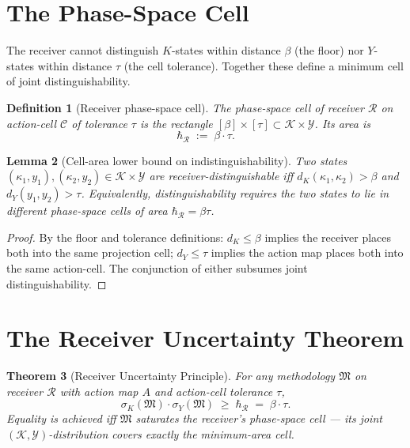 \documentclass[11pt,a4paper]{article}
\newtheorem{theorem}{Theorem}[section]
\newtheorem{lemma}[theorem]{Lemma}
\newtheorem{definition}[theorem]{Definition}
\newcommand{\Action}{\mathcal{Y}}
\newcommand{\Knowl}{\mathcal{K}}
\newcommand{\Cell}{\mathcal{C}}
\newcommand{\Method}{\mathfrak{M}}
\newcommand{\receiver}{\mathcal{R}}
\newcommand{\hbarR}{\hbar_{\receiver}}
\newcommand{\disp}{\sigma}
\begin{document}
\section{The Phase-Space Cell}

The receiver cannot distinguish $K$-states within distance $\beta$ (the floor) nor $Y$-states within distance $\tau$ (the cell tolerance). Together these define a minimum cell of joint distinguishability.

\begin{definition}[Receiver phase-space cell]
\label{def:phase-cell}
The \emph{phase-space cell} of receiver $\receiver$ on action-cell $\Cell$ of tolerance $\tau$ is the rectangle $[\beta] \times [\tau] \subset \Knowl \times \Action$. Its area is
\[
\hbarR \;:=\; \beta \cdot \tau.
\]
\end{definition}

\begin{lemma}[Cell-area lower bound on indistinguishability]
\label{lem:cell-area}
Two states $(\kappa_1, y_1), (\kappa_2, y_2) \in \Knowl \times \Action$ are receiver-distinguishable iff $d_K(\kappa_1, \kappa_2) > \beta$ \emph{and} $d_Y(y_1, y_2) > \tau$. Equivalently, distinguishability requires the two states to lie in different phase-space cells of area $\hbarR = \beta \tau$.
\end{lemma}

\begin{proof}
By the floor and tolerance definitions: $d_K \leq \beta$ implies the receiver places both into the same projection cell; $d_Y \leq \tau$ implies the action map places both into the same action-cell. The conjunction of either subsumes joint distinguishability.
\end{proof}

\section{The Receiver Uncertainty Theorem}
\label{sec:uncertainty}

\begin{theorem}[Receiver Uncertainty Principle]
\label{thm:uncertainty}
For any methodology $\Method$ on receiver $\receiver$ with action map $A$ and action-cell tolerance $\tau$,
\[
\disp_K(\Method) \cdot \disp_Y(\Method) \;\geq\; \hbarR \;=\; \beta \cdot \tau.
\]
Equality is achieved iff $\Method$ saturates the receiver's phase-space cell — its joint $(\Knowl, \Action)$-distribution covers exactly the minimum-area cell.
\end{theorem}
\end{document}
